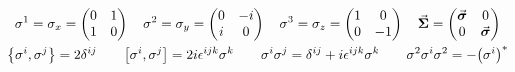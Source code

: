 \begin{gather*}
        \sigma^1 = \sigma_x = \begin{pmatrix}
                0 &1\\
                1 &0
        \end{pmatrix}
        \quad
        \sigma^2 = \sigma_y = \begin{pmatrix}
                0 &-i\\
                i &0
        \end{pmatrix}
        \quad
        \sigma^3 = \sigma_z = \begin{pmatrix}
                1 &0\\
                0 &-1
        \end{pmatrix}
        \quad
        \va*{\Sigma} = \begin{pmatrix}
                \va*{\sigma} &0\\
                0 &\va*{\sigma}\\
        \end{pmatrix}
        \\
        \acomm{\sigma^i}{\sigma^j} = 2\delta^{ij}
        \qquad
        \comm{\sigma^i}{\sigma^j} = 2i\epsilon^{ijk}\sigma^k
        \qquad
        \sigma^i\sigma^j = \delta^{ij} + i\epsilon^{ijk}\sigma^k
        \qquad
        \sigma^2\sigma^i\sigma^2 = -\qty(\sigma^i)^*
\end{gather*}

